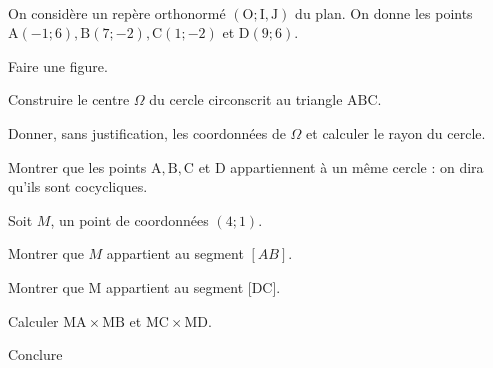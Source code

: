 \documentclass[11pt,a4paper]{article}  %
\begin{document}

  \\
On considère un repère orthonormé $(\mathrm{O} ; \mathrm{I}, \mathrm{J})$ du plan. On donne les points $\mathrm{A}(-1 ; 6), \mathrm{B}(7 ;-2), \mathrm{C}(1 ;-2)$ et $\mathrm{D}(9 ; 6)$.
\begin{enumMet}
	\item Faire une figure.
	\item  Construire le centre $\Omega$ du cercle circonscrit au triangle $\mathrm{ABC}$.
	\item Donner, sans justification, les coordonnées de $\Omega$ et calculer le rayon du cercle.
	\item  Montrer que les points $\mathrm{A}, \mathrm{B}, \mathrm{C}$ et $\mathrm{D}$ appartiennent à un même cercle : on dira qu'ils sont cocycliques.
	\item Soit $M$, un point de coordonnées $(4 ; 1)$.
	\begin{enumMet}
		\item Montrer que $M$ appartient au segment $[A B]$.
		\item Montrer que $\mathrm{M}$ appartient au segment [DC].
		\item Calculer $\mathrm{MA} \times \mathrm{MB}$ et $\mathrm{MC} \times \mathrm{MD}$.
		\item Conclure
	\end{enumMet} 
\end{enumMet}
\end{document}
